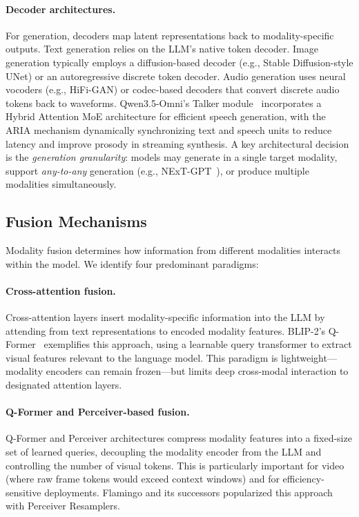 \documentclass{article}
\begin{document}
\paragraph{Decoder architectures.}
For generation, decoders map latent representations back to modality-specific outputs.
Text generation relies on the LLM's native token decoder.
Image generation typically employs a diffusion-based decoder (e.g., Stable Diffusion-style UNet) or an autoregressive discrete token decoder.
Audio generation uses neural vocoders (e.g., HiFi-GAN) or codec-based decoders that convert discrete audio tokens back to waveforms.
Qwen3.5-Omni's Talker module~\cite{qwen2026omni} incorporates a Hybrid Attention MoE architecture for efficient speech generation, with the ARIA mechanism dynamically synchronizing text and speech units to reduce latency and improve prosody in streaming synthesis.
A key architectural decision is the \emph{generation granularity}: models may generate in a single target modality, support \emph{any-to-any} generation (e.g., NExT-GPT~\cite{wu2024nextgpt}), or produce multiple modalities simultaneously.

\subsection{Fusion Mechanisms}

Modality fusion determines how information from different modalities interacts within the model.
We identify four predominant paradigms:

\paragraph{Cross-attention fusion.}
Cross-attention layers insert modality-specific information into the LLM by attending from text representations to encoded modality features.
BLIP-2's Q-Former~\cite{li2023blip2} exemplifies this approach, using a learnable query transformer to extract visual features relevant to the language model.
This paradigm is lightweight---modality encoders can remain frozen---but limits deep cross-modal interaction to designated attention layers.

\paragraph{Q-Former and Perceiver-based fusion.}
Q-Former and Perceiver architectures compress modality features into a fixed-size set of learned queries, decoupling the modality encoder from the LLM and controlling the number of visual tokens.
This is particularly important for video (where raw frame tokens would exceed context windows) and for efficiency-sensitive deployments.
Flamingo and its successors popularized this approach with Perceiver Resamplers.
\end{document}
